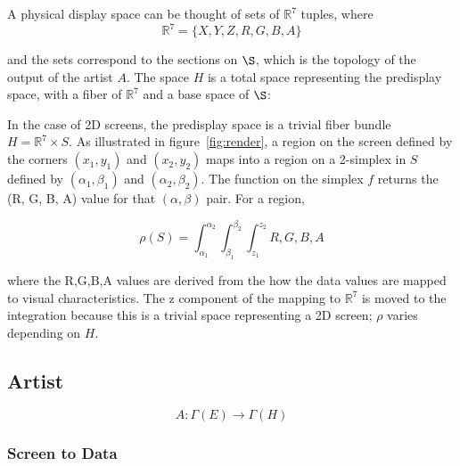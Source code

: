 \documentclass[../main.tex]{subfiles}
\begin{document}
A physical display space can be thought of sets of $\mathbb{R}^{7}$ tuples, where 
\begin{equation}
    \mathbb{R}^{7} = \{X, Y, Z, R, G, B, A\}
\end{equation}

and the sets correspond to the sections on $\S$, which is the topology of the output of the artist $A$. The space $H$ is a total space representing the predisplay space, with a fiber of $\mathbb{R}^7$ and a base space of $\S$:



In the case of 2D screens, the predisplay space is a trivial fiber bundle $H=\mathbb{R}^{7}\times S$. As illustrated in figure~\ref{fig:render}, a region on the screen defined by the corners $(x_1, y_1)$ and $(x_2, y_2)$ maps into a region on a 2-simplex in $S$ defined by $(\alpha_1, \beta_1)$ and $(\alpha_2, \beta_2)$. The function on the simplex $f$ returns the (R, G, B, A) value for that $(\alpha, \beta)$ pair. For a region, 

\begin{equation*}
\rho(S) = \int_{\alpha_1}^{\alpha_2}\int_{\beta_1}^{\beta_2}\int_{z_1}^{z_2}{R, G, B, A}  
\end{equation*}

where the R,G,B,A values are derived from the how the data values are mapped to visual characteristics. The z component of the mapping to $\mathbb{R}^7$ is moved to the integration because this is a trivial space representing a 2D screen; $\rho$ varies depending on $H$. 


\subsection{Artist}
\begin{equation}
    A: \Gamma(E) \rightarrow \Gamma(H)
\end{equation}

\subsubsection{Screen to Data}
\end{document}
